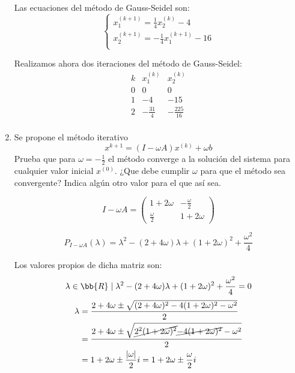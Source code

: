 \documentclass[12pt]{article}
\begin{document}
\begin{ejercicio}
\begin{enumerate}
        Las ecuaciones del método de Gauss-Seidel son:
        \begin{equation*}
            \left\{\begin{array}{l}
                x_1^{(k+1)} = \frac{1}{4}x_2^{(k)} - 4 \\
                x_2^{(k+1)} = -\frac{1}{4}x_1^{(k+1)} - 16\\
            \end{array} \right.
        \end{equation*}

        Realizamos ahora dos iteraciones del método de Gauss-Seidel:
        \begin{equation*}
            \begin{array}{c|c|c}
                k & x_1^{(k)} & x_2^{(k)} \\ \hline
                0 & 0 & 0 \\
                1 & -4 & -15 \\
                2 & -\frac{31}{4} & -\frac{225}{16} \\
            \end{array}
        \end{equation*}


        \item Se propone el método iterativo
        $$x^{k+1} = (I-\omega A)x^{(k)} + \omega b$$
        Prueba que para $\omega=-\frac{1}{2}$ el método converge a la solución del sistema para cualquier valor inicial $x^{(0)}$. ¿Que debe cumplir $\omega$ para que el método sea convergente? Indica algún otro valor para el que así sea.

        \begin{equation*}
            I-\omega A = \left( \begin{array}{cc}
                1+2\omega & -\frac{\omega}{2} \\
                \frac{\omega}{2} & 1+2\omega
            \end{array}\right)
        \end{equation*}

        \begin{equation*}
            P_{I-\omega A}(\lambda) = \lambda^2 - (2+4\omega)\lambda + (1+2\omega)^2 + \frac{\omega^2}{4}
        \end{equation*}

        Los valores propios de dicha matriz son: $$\lambda\in \bb{R} \mid \lambda^2 - (2+4\omega)\lambda + (1+2\omega)^2 + \frac{\omega^2}{4} =0$$
        \begin{equation*}\begin{split}
            \lambda &= \frac{2+4\omega \pm \sqrt{(2+4\omega)^2 -4(1+2\omega)^2 - \omega^2}}{2}\\
            &= \frac{2+4\omega \pm \sqrt{\cancel{2^2(1+2\omega)^2} \cancel{-4(1+2\omega)^2} - \omega^2}}{2} \\
            &= 1+2\omega \pm \frac{|\omega|}{2}i = 1 + 2\omega \pm \frac{\omega}{2}i
        \end{split}\end{equation*}


\end{enumerate}
\end{ejercicio}
\end{document}
